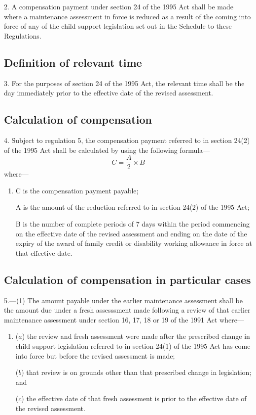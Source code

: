 \documentclass[a4paper]{article}
\begin{document}
2.  A compensation payment under section 24 of the 1995 Act shall be made where a maintenance assessment in force is reduced as a result of the coming into force of any of the child support legislation set out in the Schedule to these Regulations.

\subsection[3. Definition of relevant time]{Definition of relevant time}

3.  For the purposes of section 24 of the 1995 Act, the relevant time shall be the day immediately prior to the effective date of the revised assessment.

\subsection[4. Calculation of compensation]{Calculation of compensation}

4.  Subject to regulation 5, the compensation payment referred to in section 24(2) of the 1995 Act shall be calculated by using the following formula—
\[C = \frac{A}{2} \times B\]
where—
\begin{enumerate}\item[]
C is the compensation payment payable;

A is the amount of the reduction referred to in section 24(2) of the 1995 Act;

B is the number of complete periods of 7 days within the period commencing on the effective date of the revised assessment and ending on the date of the expiry of the award of family credit or disability working allowance in force at that effective date.
\end{enumerate}

\subsection[5. Calculation of compensation in particular cases]{Calculation of compensation in particular cases}

5.—(1) The amount payable under the earlier maintenance assessment shall be the amount due under a fresh assesssment made following a review of that earlier maintenance assessment under section 16, 17, 18 or 19 of the 1991 Act where—
\begin{enumerate}\item[]
($a$) the review and fresh assessment were made after the prescribed change in child support legislation referred to in section 24(1) of the 1995 Act has come into force but before the revised assessment is made;

($b$) that review is on grounds other than that prescribed change in legislation; and

($c$) the effective date of that fresh assessment is prior to the effective date of the revised assessment.
\end{enumerate}
\end{document}
